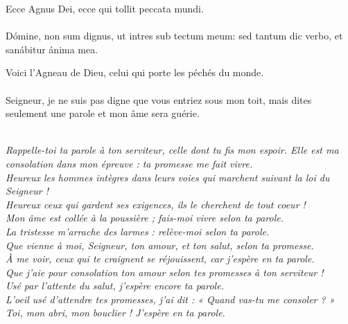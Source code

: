 \documentclass[twoside]{article}
\begin{document}
\begin{paracol}{2}
\switchcolumn*

\vv Ecce Agnus Dei, ecce qui tollit peccata mundi.\\
\\
\rr Dómine, non sum dignus, ut intres sub tectum meum: sed tantum dic verbo, et sanábitur ánima mea.

\switchcolumn

\vv Voici l'Agneau de Dieu, celui qui porte les péchés du monde.\\
~\\
\rr Seigneur, je ne suis pas digne que vous entriez sous mon toit, mais dites seulement une parole et mon âme sera guérie.
\end{paracol}


\\
\emph{\rr Rappelle-toi ta parole à ton serviteur, celle dont tu fis mon espoir. Elle est ma consolation dans mon épreuve : ta promesse me fait vivre.\\
\vv {} Heureux les hommes intègres dans leurs voies qui marchent suivant la loi du Seigneur !\\
\vv {} Heureux ceux qui gardent ses exigences, ils le cherchent de tout coeur !\\
\vv {} Mon âme est collée à la poussière ; fais-moi vivre selon ta parole.\\
\vv {} La tristesse m'arrache des larmes : relève-moi selon ta parole.\\
\vv {} Que vienne à moi, Seigneur, ton amour, et ton salut, selon ta promesse.\\
\vv {} À me voir, ceux qui te craignent se réjouissent, car j'espère en ta parole.\\
\vv {} Que j'aie pour consolation ton amour selon tes promesses à ton serviteur !\\
\vv {} Usé par l'attente du salut, j'espère encore ta parole.\\
\vv {} L'oeil usé d'attendre tes promesses, j'ai dit : « Quand vas-tu me consoler ? »\\
\vv {} Toi, mon abri, mon bouclier ! J'espère en ta parole.
}
\newpage
\end{document}
